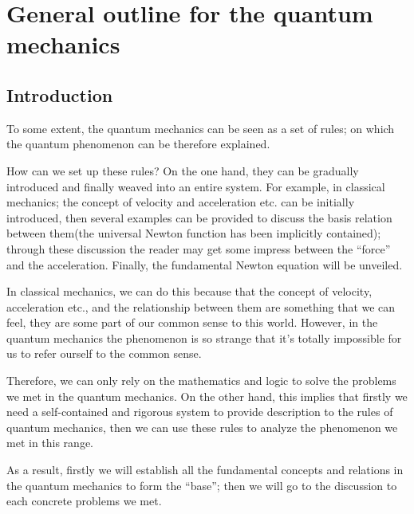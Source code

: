 %
%
%
%
%
%

\chapter{General outline for the quantum mechanics}
%
%
%
\section{Introduction}
%
%
To some extent, the quantum mechanics can be seen as a set of rules;
on which the quantum phenomenon can be therefore explained.

How can we set up these rules? On the one hand, they can be
gradually introduced and finally weaved into an entire system. For
example, in classical mechanics; the concept of velocity and
acceleration etc. can be initially introduced, then several examples
can be provided to discuss the basis relation between them(the
universal Newton function has been implicitly contained); through
these discussion the reader may get some impress between the
``force'' and the acceleration. Finally, the fundamental Newton
equation will be unveiled.

In classical mechanics, we can do this because that the concept of
velocity, acceleration etc., and the relationship between them are
something that we can feel, they are some part of our common sense
to this world. However, in the quantum mechanics the phenomenon is
so strange that it's totally impossible for us to refer ourself to
the common sense.

Therefore, we can only rely on the mathematics and logic to solve
the problems we met in the quantum mechanics. On the other hand,
this implies that firstly we need a self-contained and rigorous
system to provide description to the rules of quantum mechanics,
then we can use these rules to analyze the phenomenon we met in this
range.

As a result, firstly we will establish all the fundamental concepts
and relations in the quantum mechanics to form the ``base''; then we
will go to the discussion to each concrete problems we met.

